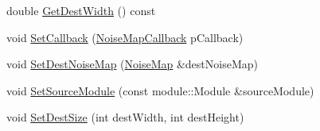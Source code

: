 \begin{DoxyCompactItemize}
\item 
double \hyperlink{classnoise_1_1utils_1_1_noise_map_builder_a911a54e1d86b59beaad313b54c7c715e}{Get\+Dest\+Width} () const 
\item 
void \hyperlink{classnoise_1_1utils_1_1_noise_map_builder_a901f165227e6095b57342698e0c682e5}{Set\+Callback} (\hyperlink{namespacenoise_1_1utils_af10741a3394fadf8798a8f40b753b208}{Noise\+Map\+Callback} p\+Callback)
\item 
void \hyperlink{classnoise_1_1utils_1_1_noise_map_builder_a07555b64324efbb16f0ef244c4fed8b7}{Set\+Dest\+Noise\+Map} (\hyperlink{classnoise_1_1utils_1_1_noise_map}{Noise\+Map} \&dest\+Noise\+Map)
\item 
void \hyperlink{classnoise_1_1utils_1_1_noise_map_builder_aa39e8ea292711aa3a7627ddcaee4f12f}{Set\+Source\+Module} (const module\+::\+Module \&source\+Module)
\item 
void \hyperlink{classnoise_1_1utils_1_1_noise_map_builder_abad282f0cbe67824b73c580f611a7bd0}{Set\+Dest\+Size} (int dest\+Width, int dest\+Height)
\end{DoxyCompactItemize}
